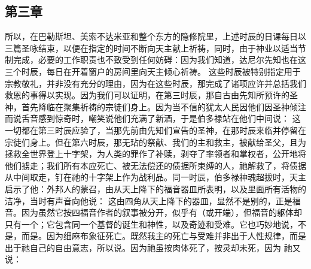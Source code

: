 
\subsection{第三章}

\par

所以，在巴勒斯坦、美索不达米亚和整个东方的隐修院里，上述时辰的日课每日以三篇圣咏结束，以便在指定的时间不断向天主献上祈祷，同时，由于神业以适当节制完成，必要的工作职责也不致受到任何妨碍：因为我们知道，达尼尔先知也在这三个时辰，每日在开着窗户的房间里向天主倾心祈祷。 这些时辰被特别指定用于宗教敬礼，并非没有充分的理由，因为在这些时辰，那完成了诸项应许并总括我们救恩的事得以实现。因为我们可以证明，在第三时辰，那自古由先知所预许的圣神，首先降临在聚集祈祷的宗徒们身上。因为当不信的犹太人民因他们因圣神倾注而说舌音感到惊奇时，嘲笑说他们充满了新酒，于是伯多禄站在他们中间说：  这一切都在第三时辰应验了，当那先前由先知们宣告的圣神，在那时辰来临并停留在宗徒们身上。但在第六时辰，那无玷的祭献、我们的主和救主，被献给圣父，且为拯救全世界登上十字架，为人类的罪作了补赎，剥夺了率领者和掌权者，公开地将他们掳走；我们所有本应死亡、被无法偿还的债据所束缚的人，祂解救了，将债据从中间取走，钉在祂的十字架上作为战利品。同一时辰，伯多禄神魂超拔时，天主启示了他：外邦人的蒙召，由从天上降下的福音器皿所表明，以及里面所有活物的洁净，当时有声音向他说： 这由四角从天上降下的器皿，显然不是别的，正是福音。因为虽然它按四福音作者的叙事被分开，似乎有（或开端），但福音的躯体却只有一个；它包含同一个基督的诞生和神性，以及奇迹和受难。它也巧妙地说，不是，而是。因为细麻布象征死亡。既然我主的死亡与受难并非出于人性规律，而是出于祂自己的自由意志，所以说。因为祂虽按肉体死了，按灵却未死，因为 祂又说：  